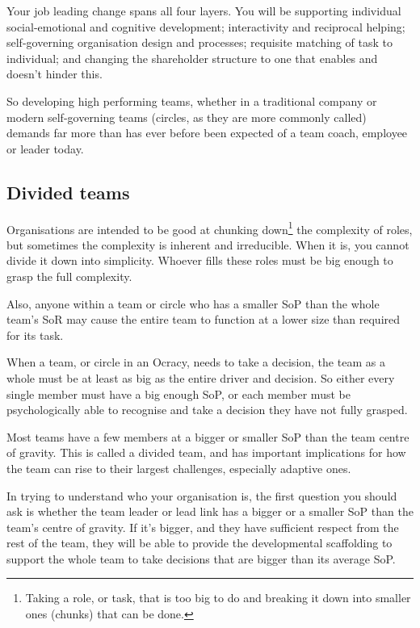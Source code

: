 Your job leading change spans all four layers. You will be supporting individual social-emotional and cognitive development; interactivity and reciprocal helping; self-governing organisation design and processes; requisite matching of task to individual; and changing the shareholder structure to one that enables and doesn’t hinder this. 


So developing high performing teams, whether in a traditional company or modern self-governing teams (circles, as they are more commonly called) demands far more than has ever before been expected of a team coach, employee or leader today. 


\subsection{Divided teams}
\label{section:divided-teams}
Organisations are intended to be good at chunking down\footnote{Taking a role, or task, that is too big to do and breaking it down into smaller ones (chunks) that can be done.} the complexity of roles, but sometimes the complexity is inherent and irreducible. When it is, you cannot divide it down into simplicity. Whoever fills these roles must be big enough to grasp the full complexity. 


Also, anyone within a team or circle who has a smaller SoP than the whole team’s SoR  may cause the entire team to function at a lower size than required for its task.


When a team, or circle in an Ocracy, needs to take a decision, the team as a whole must be at least as big as the entire driver and decision. So either every single member must have a big enough SoP, or each member must be psychologically able to recognise and take a decision they have not fully grasped. 


Most teams have a few members at a bigger or smaller SoP than the team centre of gravity. This is called a divided team, and has important implications for how the team can rise to their largest challenges, especially adaptive ones. 


In trying to understand who your organisation  is, the first question you should ask is whether the team leader or lead link has a bigger or a smaller SoP than the team's centre of gravity. If it’s bigger, and they have sufficient respect from the rest of the team, they will be able to provide the developmental scaffolding to support the whole team to take decisions that are bigger than its average SoP.


